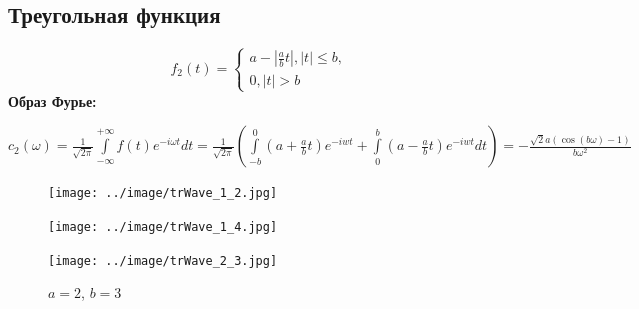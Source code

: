   \subsection{Треугольная функция}
  \[
  f_2(t) =  \begin{cases}
    a - |\frac{a}{b}t|, |t| \leq b,\\
    0, |t| > b
  \end{cases}
  \]
  \textbf{Образ Фурье:}  \\
  \begin{center}
    $c_2(\omega) = \frac{1}{\sqrt{2\pi}} \int\limits_{-\infty}^{+\infty}f(t)e^{-i\omega t}dt = 
  \frac{1}{\sqrt{2\pi}}(\int\limits_{-b}^{0}(a + \frac{a}{b}t)e^{-iwt} + \int\limits_0^{b} (a - \frac{a}{b}t)e^{-iwt}dt) = -\frac{\sqrt{2}a(\cos(b\omega) - 1)}{b\omega^2}
  $
  \end{center}
  \begin{figure}[!htb]
      \texttt{[image: ../image/trWave\_1\_2.jpg]}
      \caption{$a=1$, $b=2$}
    \endminipage\hfill
      \texttt{[image: ../image/trWave\_1\_4.jpg]}
      \caption{$a = 1$, $b = 4$}
    \endminipage\hfill
      \texttt{[image: ../image/trWave\_2\_3.jpg]}
      \caption{$a = 2$, $b = 3$}
    \endminipage
    \end{figure}

